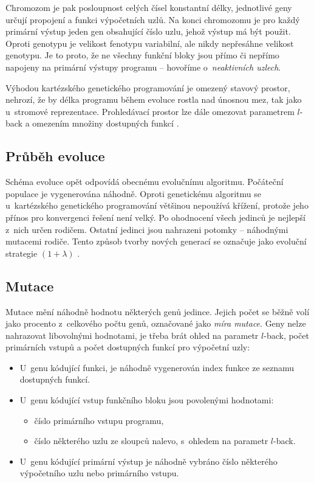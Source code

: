 Chromozom je pak posloupnost celých čísel konstantní délky, jednotlivé geny určují propojení a funkci výpočetních uzlů. Na konci chromozomu je pro každý primární výstup jeden gen obsahující číslo uzlu, jehož výstup má být použit. Oproti genotypu je velikost fenotypu variabilní, ale nikdy nepřesáhne velikost genotypu. Je to proto, že ne všechny funkční bloky jsou přímo či nepřímo napojeny na primární výstupy programu -- hovoříme o~\emph{neaktivních uzlech}.

Výhodou kartézského genetického programování je omezený stavový prostor, nehrozí, že by délka programu během evoluce rostla nad únosnou mez, tak jako u~stromové reprezentace. Prohledávací prostor lze dále omezovat parametrem $l$-back a omezením množiny dostupných funkcí \cite{ZelenaCGP, Modra, HandbookGP}.

\subsection{Průběh evoluce}
\label{secCGPEvo}

Schéma evoluce opět odpovídá obecnému evolučnímu algoritmu. Počáteční populace je vygenerována náhodně. Oproti genetickému algoritmu se u~kartézského genetického programování většinou nepoužívá křížení, protože jeho přínos pro konvergenci řešení není velký. Po ohodnocení všech jedinců je nejlepší z~nich určen rodičem. Ostatní jedinci jsou nahrazeni potomky -- náhodnými mutacemi rodiče. Tento způsob tvorby nových generací se označuje jako evoluční strategie $(1 + \lambda)$ \cite{Modra}.

\subsection{Mutace}

Mutace mění náhodně hodnotu některých genů jedince. Jejich počet se běžně volí jako procento z~celkového počtu genů, označované jako \emph{míra mutace}. Geny nelze nahrazovat libovolnými hodnotami, je třeba brát ohled na parametr $l$-back, počet primárních vstupů a počet dostupných funkcí pro výpočetní uzly:

\begin{itemize}
    \item U~genu kódující funkci, je náhodně vygenerován index funkce ze seznamu dostupných funkcí.
    \item U~genu kódující vstup funkčního bloku jsou povolenými hodnotami:
        \begin{itemize}
            \item číslo primárního vstupu programu,
            \item číslo některého uzlu ze sloupců nalevo, s~ohledem na parametr $l$-back.
        \end{itemize}
    \item U~genu kódující primární výstup je náhodně vybráno číslo některého výpočetního uzlu nebo primárního vstupu.
\end{itemize}

